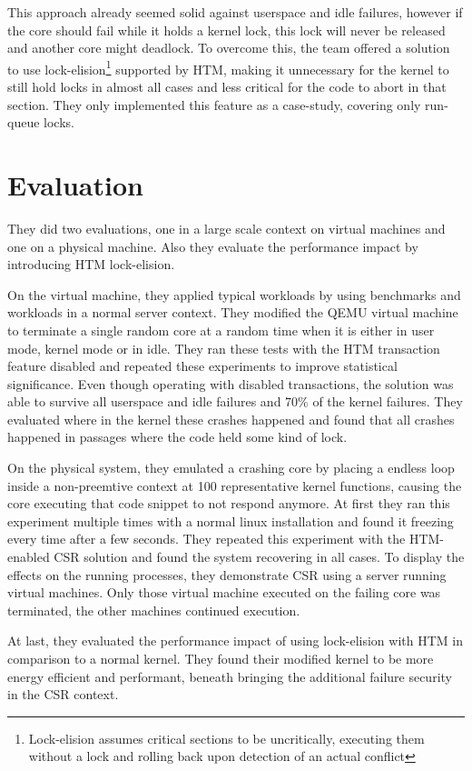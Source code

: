 \documentclass[a4paper,10pt,twoside]{article}
\begin{document}
This approach already seemed solid against userspace and idle failures, however if the core should fail while it holds a kernel lock, this lock will never be released and another core might deadlock. To overcome this, the team offered a solution to use lock-elision\footnote{Lock-elision assumes critical sections to be uncritically, executing them without a lock and rolling back upon detection of an actual conflict} supported by HTM, making it unnecessary for the kernel to still hold locks in almost all cases and less critical for the code to abort in that section. They only implemented this feature as a case-study, covering only run-queue locks.

\section{Evaluation}
They did two evaluations, one in a large scale context on virtual machines and one on a physical machine. Also they evaluate the performance impact by introducing HTM lock-elision.

On the virtual machine, they applied typical workloads by using benchmarks and workloads in a normal server context. They modified the QEMU virtual machine to terminate a single random core at a random time when it is either in user mode, kernel mode or in idle. They ran these tests with the HTM transaction feature disabled and repeated these experiments to improve statistical significance. Even though operating with disabled transactions, the solution was able to survive all userspace and idle failures and 70\% of the kernel failures. They evaluated where in the kernel these crashes happened and found that all crashes happened in passages where the code held some kind of lock.

On the physical system, they emulated a crashing core by placing a endless loop inside a non-preemtive context at 100 representative kernel functions, causing the core executing that code snippet to not respond anymore. At first they ran this experiment multiple times with a normal linux installation and found it freezing every time after a few seconds. They repeated this experiment with the HTM-enabled CSR solution and found the system recovering in all cases. To display the effects on the running processes, they demonstrate CSR using a server running virtual machines. Only those virtual machine executed on the failing core was terminated, the other machines continued execution.

At last, they evaluated the performance impact of using lock-elision with HTM in comparison to a normal kernel. They found their modified kernel to be more energy efficient and performant, beneath bringing the additional failure security in the CSR context.
\end{document}
